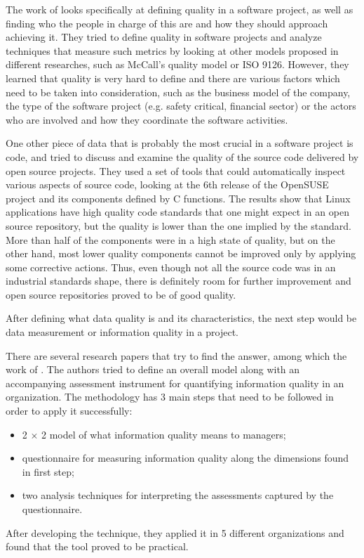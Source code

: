 \documentclass{mprop}
\begin{document}
The work of \citet{kitchenham1996software} looks specifically at defining
quality in a software project, as well as finding who the people in charge of this 
are and how they should approach achieving it. They tried to define quality 
in software projects and analyze techniques that measure such metrics by looking
at other models proposed in different researches, such as McCall's quality
model or ISO 9126. However, they learned that quality is very hard to define and
there are various factors which need to be taken into consideration, such as the
business model of the company, the type of the software project (e.g. safety 
critical, financial sector) or the actors who are involved and how they coordinate
the software activities.

One other piece of data that is probably the most crucial in a software project
is code, and \citet{stamelos2002code} tried to discuss and examine the quality
of the source code delivered by open source projects. They used a set of tools
that could automatically inspect various aspects of source code, looking at
the 6th release of the OpenSUSE project and its components defined by C
functions. The results show that Linux applications have high quality 
code standards that one might expect in an open source repository, but 
the quality is lower than the one implied by the standard. More than half
of the components were in a high state of quality, but on the other hand, 
most lower quality components cannot be improved only by applying some
corrective actions. Thus, even though not all the source code was in 
an industrial standards shape, there is definitely room for further 
improvement and open source repositories proved to be of good quality.

After defining what data quality is and its characteristics, the next 
step would be data measurement or information quality in a project. 

There are several research papers that try to find the answer, among which the 
work of \citet{lee2002aimq}. The authors tried to define an overall model along 
with an accompanying assessment instrument for quantifying information quality 
in an organization. The methodology has 3 main steps that need to be followed 
in order to apply it successfully:
  \begin{itemize}
    \item 2 $\times$ 2 model of what information quality means to managers;
    \item questionnaire for measuring information quality along the dimensions
    found in first step;
    \item two analysis techniques for interpreting the assessments captured 
    by the questionnaire.
  \end{itemize} 
After developing the technique, they applied it in 5 different organizations and
found that the tool proved to be practical.
\end{document}
